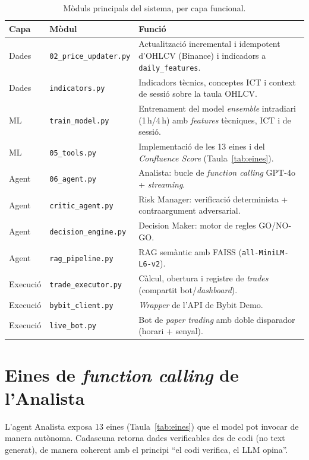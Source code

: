 \documentclass[10pt,twocolumn,a4paper]{article}
\begin{document}
\begin{table}[H]
\centering
\caption{Mòduls principals del sistema, per capa funcional.}
\label{tab:moduls}
\small
\begin{tabular}{@{}lL{4.6cm}L{7.0cm}@{}}
\toprule
\textbf{Capa} & \textbf{Mòdul} & \textbf{Funció} \\
\midrule
Dades   & \texttt{02\_price\_updater.py} & Actualització incremental i idempotent d'OHLCV (Binance) i indicadors a \texttt{daily\_features}. \\
Dades   & \texttt{indicators.py}         & Indicadors tècnics, conceptes ICT i context de sessió sobre la taula OHLCV. \\
ML      & \texttt{train\_model.py}       & Entrenament del model \textit{ensemble} intradiari (1\,h/4\,h) amb \textit{features} tècniques, ICT i de sessió. \\
ML      & \texttt{05\_tools.py}          & Implementació de les 13 eines i del \textit{Confluence Score} (Taula~\ref{tab:eines}). \\
Agent   & \texttt{06\_agent.py}          & Analista: bucle de \textit{function calling} GPT-4o + \textit{streaming}. \\
Agent   & \texttt{critic\_agent.py}      & Risk Manager: verificació determinista + contraargument adversarial. \\
Agent   & \texttt{decision\_engine.py}   & Decision Maker: motor de regles GO/NO-GO. \\
Agent   & \texttt{rag\_pipeline.py}      & RAG semàntic amb FAISS (\texttt{all-MiniLM-L6-v2}). \\
Execució& \texttt{trade\_executor.py}    & Càlcul, obertura i registre de \textit{trades} (compartit bot/\textit{dashboard}). \\
Execució& \texttt{bybit\_client.py}      & \textit{Wrapper} de l'API de Bybit Demo. \\
Execució& \texttt{live\_bot.py}          & Bot de \textit{paper trading} amb doble disparador (horari + senyal). \\
\bottomrule
\end{tabular}
\end{table}

\section{Eines de \textit{function calling} de l'Analista}
\label{ap:eines}
L'agent Analista exposa 13 eines (Taula~\ref{tab:eines}) que el model pot invocar de
manera autònoma. Cadascuna retorna dades verificables des de codi (no text generat),
de manera coherent amb el principi ``el codi verifica, el LLM opina''.
\end{document}
